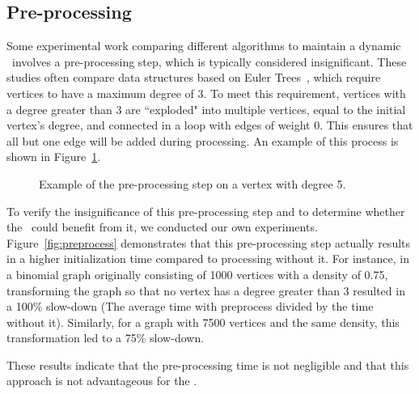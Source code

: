     
    \subsection*{Pre-processing}
    Some experimental work \cite{Amato1997,cattaneo2010,Iyer2001,Frederickson1985} comparing different algorithms to maintain a dynamic \mst\ involves a pre-processing step, which is typically considered insignificant. These studies often compare data structures based on Euler Trees~\cite{Sleator1983}, which require vertices to have a maximum degree of 3. To meet this requirement, vertices with a degree greater than 3 are ``exploded" into multiple vertices, equal to the initial vertex's degree, and connected in a loop with edges of weight 0. This ensures that all but one edge will be added during processing. An example of this process is shown in Figure~\ref{fig:preprocess:example}.

    \begin{figure}
        \centering
        \resizebox{0.8\textwidth}{!}{
        }
        \caption{Example of the pre-processing step on a vertex with degree 5.\label{fig:preprocess:example}}
    \end{figure}

    To verify the insignificance of this pre-processing step and to determine whether the \DPmst\ could benefit from it, we conducted our own experiments. Figure~\ref{fig:preprocess} demonstrates that this pre-processing step actually results in a higher initialization time compared to processing without it. For instance, in a binomial graph originally consisting of 1000 vertices with a density of 0.75, transforming the graph so that no vertex has a degree greater than 3 resulted in a 100\% slow-down (The average time with preprocess divided by the time without it). Similarly, for a graph with 7500 vertices and the same density, this transformation led to a 75\% slow-down.

    These results indicate that the pre-processing time is not negligible and that this approach is not advantageous for the \DPmst.


